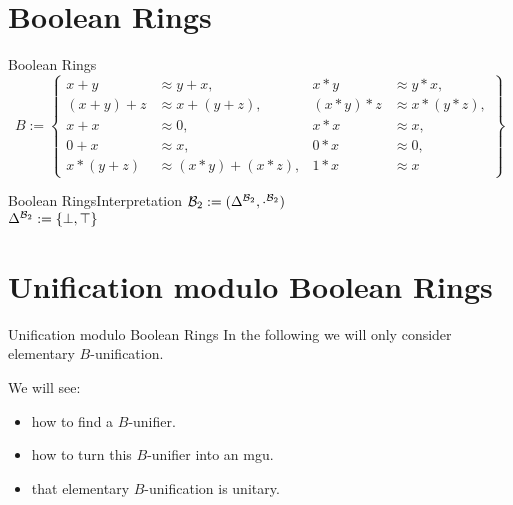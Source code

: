 \section{Boolean Rings}
\begin{frame}{Boolean Rings}
\[B:=\left\lbrace 
	\begin{aligned}
		x+y     & \approx y+x,         & x*y     & \approx y*x,     \\
		(x+y)+z & \approx x+(y+z),     & (x*y)*z & \approx x*(y*z), \\
		x+x     & \approx 0,           & x*x     & \approx x,       \\
		0+x     & \approx x,           & 0*x     & \approx 0,       \\
		x*(y+z) & \approx (x*y)+(x*z), & 1*x     & \approx x        
	\end{aligned}
	\right\rbrace \]
\end{frame}

\begin{frame}{Boolean Rings}{Interpretation}
${\mathcal{B}_2}:=(\Delta^{\mathcal{B}_2},\cdot^{\mathcal{B}_2})$\\
\vspace{10pt}\hspace{10pt}
$\Delta^{\mathcal{B}_2}:=\left\lbrace\bot,\top\right\rbrace$
\end{frame}

\section{Unification modulo Boolean Rings}
\begin{frame}{Unification modulo Boolean Rings}
In the following we will only consider elementary $B$-unification.\vspace{10pt}

We will see:
\begin{itemize}
\setlength{\itemsep}{6pt}
\item how to find a $B$-unifier.
\item how to turn this $B$-unifier into an mgu.
\item that elementary $B$-unification is unitary.
\end{itemize}
\end{frame}

